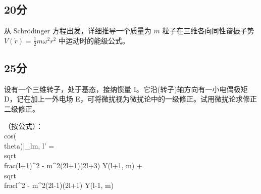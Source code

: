 \subsection{20分}
 从 Schrödinger 方程出发，详细推导一个质量为 $m$ 粒子在三维各向同性谐振子势 $V(\dot{r}) = \frac{1}{2} m \omega^2 r^2$ 中运动时的能级公式。
\subsection{25分}
 设有一个三维转子，处于基态，接纳惯量 I。它沿(转子)轴方向有一小电偶极矩 D，记在加上一外电场 E，可将微扰视为微扰论中的一级修正。试用微扰论求修正二级修正。

（按公式）：
\\cos(\\theta)|_{lm, l'} = \\sqrt{\\frac{(l+1)^2 - m^2}{(2l+1)(2l+3)}} Y(l+1, m) + \\sqrt{\\frac{l^2 - m^2}{(2l-1)(2l+1)}} Y(l-1, m)
